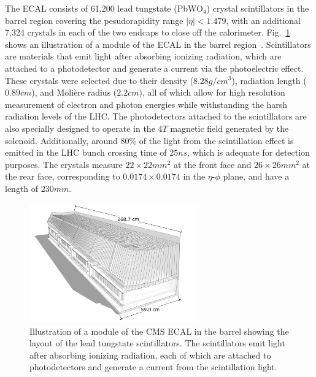 The ECAL consists of 61,200 lead tungstate (PbWO$_4$) crystal scintillators in the barrel region covering the pesudorapidity range $|\eta|<1.479$, with an additional 7,324 crystals in each of the two endcaps to close off the calorimeter.
Fig.~\ref{fig:CMSECAL} shows an illustration of a module of the ECAL in the barrel region~\cite{Sakuma_2014}.
Scintillators are materials that emit light after absorbing ionizing radiation, which are attached to a photodetector and generate a current via the photoelectric effect.
These crystals were selected due to their density ($8.28\unit{g/cm^3}$), radiation length ($0.89\unit{cm}$), and Moli\`{e}re radius ($2.2\unit{cm}$), all of which allow for high resolution measurement of electron and photon energies while withstanding the harsh radiation levels of the LHC.
The photodetectors attached to the scintillators are also specially designed to operate in the $4\unit{T}$ magnetic field generated by the solenoid.
Additionally, around 80\% of the light from the scintillation effect is emitted in the LHC bunch crossing time of $25\unit{ns}$, which is adequate for detection purposes.
The crystals measure $22\times22\unit{mm^2}$ at the front face and $26\times26\unit{mm^2}$ at the rear face, corresponding to $0.0174\times0.0174$ in the $\eta$-$\phi$ plane, and have a length of $230\unit{mm}$.

\begin{figure}[htbp]
  \centering
  \includegraphics[width=0.65\textwidth]{fig/experiment/20130816_01_EB_module_1.pdf}
  \caption{
    Illustration of a module of the CMS ECAL in the barrel showing the layout of the lead tungstate scintillators.
    The scintillators emit light after absorbing ionizing radiation, each of which are attached to photodetectors and generate a current from the scintillation light.
  }
  \label{fig:CMSECAL}
\end{figure}


